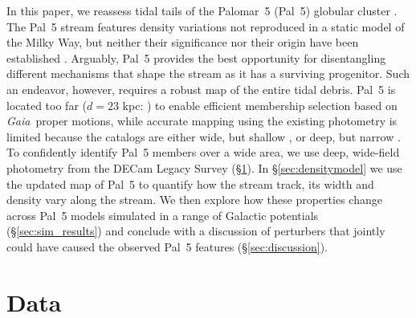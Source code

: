 \documentclass[twocolumn]{aastex62}
\newcommand{\gaia}{\textsl{Gaia}}
\begin{document}
In this paper, we reassess tidal tails of the Palomar~5 (Pal~5) globular cluster \citep{Odenkirchen:2001, Rockosi:2002}.
The Pal~5 stream features density variations not reproduced in a static model of the Milky Way, but neither their significance nor their origin have been established \citep{Carlberg:2012, Bernard:2016, Ibata:2016, Erkal:2017}.
Arguably, Pal~5 provides the best opportunity for disentangling different mechanisms that shape the stream as it has a surviving progenitor. Such an endeavor, however, requires a robust map of the entire tidal debris.
Pal~5 is located too far ($d = 23$ kpc: \citealt{Dotter:2011}) to enable efficient membership selection based on \gaia\ proper motions, while accurate mapping using the existing photometry is limited because the catalogs are either wide, but shallow \citep{Bernard:2016}, or deep, but narrow \citep{Ibata:2016}.
To confidently identify Pal~5 members over a wide area, we use deep, wide-field photometry from the DECam Legacy Survey (\S\ref{sec:data}).
In \S\ref{sec:densitymodel} we use the updated map of Pal~5 to quantify how the stream track, its width and density vary along the stream.
We then explore how these properties change across Pal~5 models simulated in a range of Galactic potentials (\S\ref{sec:sim_results}) and conclude with a discussion of perturbers that jointly could have caused the observed Pal~5 features (\S\ref{sec:discussion}).


\section{Data}
\label{sec:data}
\end{document}
